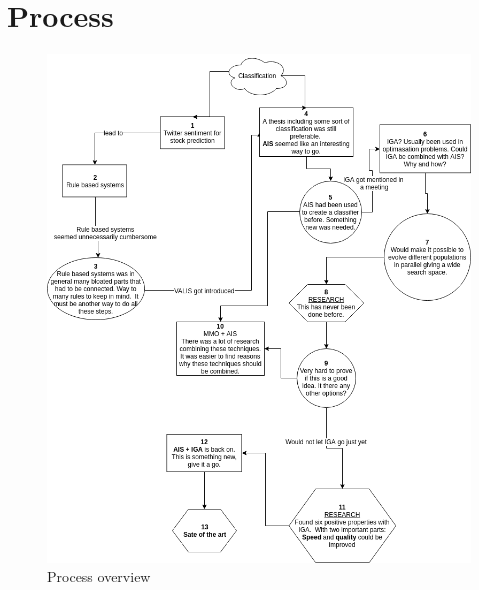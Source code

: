 
\section{Process}


\label{fig:process}
\begin{figure}[H]
    \centering
    \includegraphics[width=0.9\columnwidth]{figs/process.png}
    \caption{Process overview}
    \label{fig:process_map}
\end{figure}

